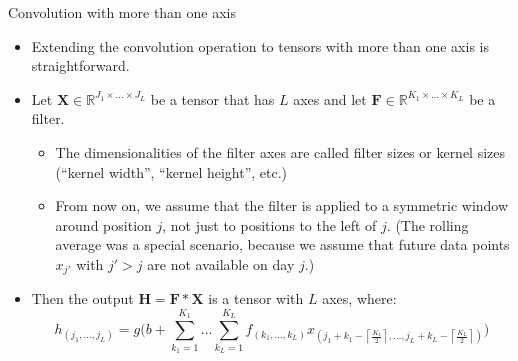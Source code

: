 
\begin{vbframe}{Convolution with more than one axis}

\vfill

\begin{itemize}
	\item Extending the convolution operation to tensors with more than one axis is straightforward.
	\item Let $\mathbf{X} \in \mathbb{R}^{J_1 \times \ldots \times J_L}$ be a tensor that has $L$ axes and let $\mathbf{F} \in \mathbb{R}^{K_1 \times \ldots \times K_L}$ be a filter.
		\begin{itemize}
		\item The dimensionalities of the filter axes are called filter sizes or kernel sizes (``kernel width'', ``kernel height'', etc.)
		\item From now on, we assume that the filter is applied to a symmetric window around position $j$, not just to positions to the left of $j$. (The rolling average was a special scenario, because we assume that future data points $x_{j'}$ with $j' > j$ are not available on day $j$.)
		\end{itemize}
	\item Then the output $\mathbf{H} = \mathbf{F} * \mathbf{X}$ is a tensor with $L$ axes, where:
	$$h_{(j_1, \ldots, j_L)} = g\big(b + \sum_{k_1=1}^{K_1} \ldots \sum_{k_L=1}^{K_L} f_{(k_1, \ldots, k_L)} x_{(j_1 + k_1 - \left\lceil \frac{K_1}{2} \right\rceil, \ldots, j_L + k_L - \left\lceil \frac{K_L}{2} \right\rceil)}\big)$$
\end{itemize} 

\vfill

\end{vbframe}



